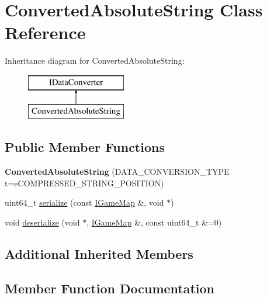\hypertarget{class_converted_absolute_string}{}\section{Converted\+Absolute\+String Class Reference}
\label{class_converted_absolute_string}
Inheritance diagram for Converted\+Absolute\+String\+:\begin{figure}[H]
\begin{center}
\leavevmode
\includegraphics[height=2.000000cm]{class_converted_absolute_string}
\end{center}
\end{figure}
\subsection*{Public Member Functions}
\begin{DoxyCompactItemize}
\item 
\hypertarget{class_converted_absolute_string_a2352bc38db0a4fdca494981654a19bf0}{}{\bfseries Converted\+Absolute\+String} (D\+A\+T\+A\+\_\+\+C\+O\+N\+V\+E\+R\+S\+I\+O\+N\+\_\+\+T\+Y\+P\+E t=e\+C\+O\+M\+P\+R\+E\+S\+S\+E\+D\+\_\+\+S\+T\+R\+I\+N\+G\+\_\+\+P\+O\+S\+I\+T\+I\+O\+N)\label{class_converted_absolute_string_a2352bc38db0a4fdca494981654a19bf0}

\item 
uint64\+\_\+t \hyperlink{class_converted_absolute_string_afa4ed352d4b11297bfff2a8f07a0bea4}{serialize} (const \hyperlink{class_i_game_map}{I\+Game\+Map} \&, void $\ast$)
\item 
void \hyperlink{class_converted_absolute_string_a827f3edeb31a7b335e945cd89e74a8da}{deserialize} (void $\ast$, \hyperlink{class_i_game_map}{I\+Game\+Map} \&, const uint64\+\_\+t \&=0)
\end{DoxyCompactItemize}
\subsection*{Additional Inherited Members}


\subsection{Member Function Documentation}
\hypertarget{class_converted_absolute_string_a827f3edeb31a7b335e945cd89e74a8da}{}
